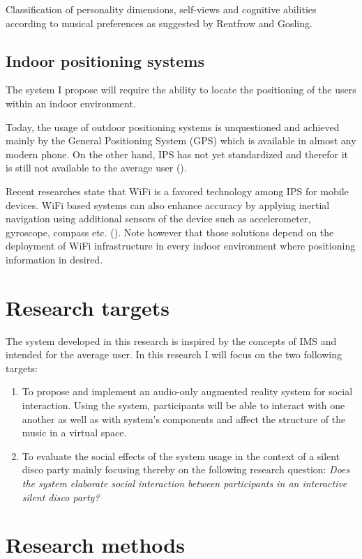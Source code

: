 \documentclass[a4paper,11pt]{article}
\begin{document}
Classification of personality dimensions, self-views and cognitive abilities according to musical preferences as suggested by Rentfrow and Gosling.

\subsection{Indoor positioning systems}

The system I propose will require the ability to locate the positioning of the users within an indoor environment.

Today, the usage of outdoor positioning systems is unquestioned and achieved mainly by the General Positioning System (GPS) which is available in almost any modern phone.
On the other hand, IPS has not yet standardized and therefor it is still not available to the average user (\cite{web:turetsky}).

Recent researches state that WiFi is a favored technology among IPS for mobile devices.
WiFi based systems can also enhance accuracy by applying inertial navigation using additional sensors of the device such as accelerometer, gyroscope, compass etc. (\cite{web:harrop}).
Note however that those solutions depend on the deployment of WiFi infrastructure in every indoor environment where positioning information in desired.

\section{Research targets}

The system developed in this research is inspired by the concepts of IMS and intended for the average user. In this research I will focus on the two following targets:
\begin{enumerate}
	\item To propose and implement an audio-only augmented reality system for social interaction.
	Using the system, participants will be able to interact with one another as well as with system's components and affect the structure of the music in a virtual space.
	\item To evaluate the social effects of the system usage in the context of a silent disco party mainly focusing thereby on the following research question: \emph{Does the system elaborate social interaction between participants in an interactive silent disco party?}
\end{enumerate}

\section{Research methods}
\end{document}
